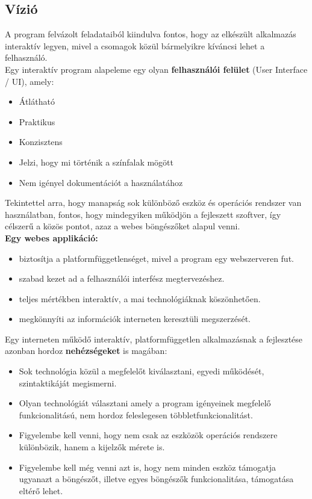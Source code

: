 \pagebreak

	\subsection{Vízió}
	
	A program felvázolt feladataiból kiindulva fontos, hogy az elkészült alkalmazás interaktív legyen, mivel a csomagok közül bármelyikre kíváncsi lehet a felhasználó.\\
	
	Egy interaktív program alapeleme egy olyan \textbf{felhasználói felület} (User Interface / UI), amely: 
	
	\begin{itemize}
		\item Átlátható
		\item Praktikus
		\item Konzisztens
		\item Jelzi, hogy mi történik a színfalak mögött
		\item Nem igényel dokumentációt a használatához
	\end{itemize}
	
	Tekintettel arra, hogy manapság sok különböző eszköz és operációs rendszer van használatban, fontos, hogy mindegyiken működjön a fejleszett szoftver, így célszerű a közös pontot, azaz a webes böngészőket alapul venni.\\
	 
	\textbf{Egy webes applikáció:}
	\begin{itemize}
		\item biztosítja a platformfüggetlenséget, mivel a program egy webszerveren fut.
		\item szabad kezet ad a felhasználói interfész megtervezéshez.
		\item teljes mértékben interaktív, a mai technológiáknak köszönhetően.
		\item megkönnyíti az információk interneten keresztüli megszerzését.
	\end{itemize}
	
	Egy interneten működő interaktív, platformfüggetlen alkalmazásnak a fejlesztése azonban hordoz \textbf{nehézségeket} is magában:
	\begin{itemize}
		\item Sok technológia közül a megfelelőt kiválasztani, egyedi működését, szintaktikáját megismerni.
		\item Olyan technológiát választani amely a program igényeinek megfelelő funkcionalitású, nem hordoz feleslegesen többletfunkcionalitást.
		\item Figyelembe kell venni, hogy nem csak az eszközök operációs rendszere különbözik, hanem a kijelzők mérete is.
		\item Figyelembe kell még venni azt is, hogy nem minden eszköz támogatja ugyanazt a böngészőt, illetve egyes böngészők funkcionalitása, támogatása eltérő lehet.
	\end{itemize}
	
